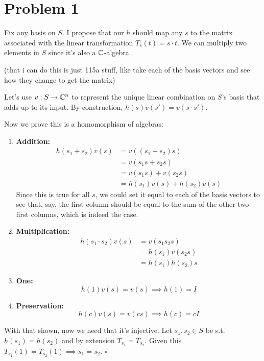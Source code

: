 \documentclass[12pt]{article}
\begin{document}
\section{Problem 1}

Fix any basis on $S$.
I propose that our $h$ should map any $s$ to the matrix associated with
the linear transformation $T_s(t)=s \cdot t$.
We can multiply two elements in $S$ since it's also a $\mathbb{C}$-algebra.

(that i can do this is just 115a stuff,
like take each of the basis vectors and see how they change to get the matrix)

Let's use $v: S \to \mathbb{C}^n$ to represent the unique linear combination
on $S$'s basis that adds up to its input.
By construction, $h(s)v(s')=v(s \cdot s')$.


Now we prove this is a homomorphism of algebras:
\begin{enumerate}
  \item \textbf{Addition:}
        \begin{align*}
          h(s_1+s_2)v(s)
           & = v((s_1+s_2)s)         \\
           & = v(s_1s+s_2s)          \\
           & = v(s_1s)+v(s_2s)       \\
           & = h(s_1)v(s)+h(s_2)v(s)
        \end{align*}
        Since this is true for all $s$, we could set it equal to each of the basis
        vectors to see that, say, the first column should be equal to the sum of
        the other two first columns, which is indeed the case.

  \item \textbf{Multiplication:}
        \begin{align*}
          h(s_1 \cdot s_2)v(s)
           & = v(s_1s_2s)    \\
           & = h(s_1)v(s_2s) \\
           & = h(s_1)h(s_2)s
        \end{align*}

  \item \textbf{One:}
        \[h(1)v(s)=v(s) \implies h(1)=I\]

  \item \textbf{Preservation:}
        \[h(c)v(s)=v(cs) \implies h(c)=cI\]
\end{enumerate}

With that shown, now we need that it's injective.
Let $s_1, s_2 \in S$ be s.t. $h(s_1)=h(s_2)$ and by extension $T_{s_1}=T_{s_2}$.
Given this $T_{s_1}(1)=T_{s_2}(1) \implies s_1=s_2$. $\square$
\end{document}
